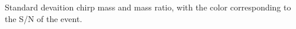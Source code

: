 \label{fig:mass_std_snr} Standard devaition chirp mass and mass ratio, with the color corresponding to the S/N of the event.